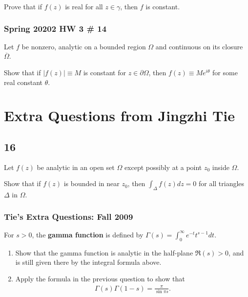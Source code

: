 Prove that if \(f(z)\) is real for all \(z\in \gamma\), then \(f\) is
constant.

\hypertarget{spring-20202-hw-3-14}{%
\subsubsection{Spring 20202 HW 3 \# 14}\label{spring-20202-hw-3-14}}

Let \(f\) be nonzero, analytic on a bounded region \(\Omega\) and
continuous on its closure \(\overline \Omega\).

Show that if \({\left\lvert {f(z)} \right\rvert} \equiv M\) is constant
for \(z\in \partial \Omega\), then \(f(z) \equiv Me^{i\theta}\) for some
real constant \(\theta\).

\hypertarget{extra-questions-from-jingzhi-tie}{%
\section{Extra Questions from Jingzhi
Tie}\label{extra-questions-from-jingzhi-tie}}

\hypertarget{section-7}{%
\subsection{16}\label{section-7}}

Let \(f(z)\) be analytic in an open set \(\Omega\) except possibly at a
point \(z_0\) inside \(\Omega\).

Show that if \(f(z)\) is bounded in near \(z_0\), then
\(\displaystyle \int_\Delta f(z) dz = 0\) for all triangles \(\Delta\)
in \(\Omega\).

\hypertarget{ties-extra-questions-fall-2009-12}{%
\subsubsection{Tie's Extra Questions: Fall
2009}\label{ties-extra-questions-fall-2009-12}}

For \(s>0\), the \textbf{gamma function} is defined by
\(\displaystyle{\Gamma(s)=\int_0^{\infty} e^{-t}t^{s-1} dt}\).

\begin{enumerate}
\def\labelenumi{\arabic{enumi}.}
\item
  Show that the gamma function is analytic in the half-plane
  \(\Re (s)>0\), and is still given there by the integral formula above.
\item
  Apply the formula in the previous question to show that
  \begin{align*}\Gamma(s)\Gamma(1-s)=\frac{\pi}{\sin \pi s}.\end{align*}
\end{enumerate}


